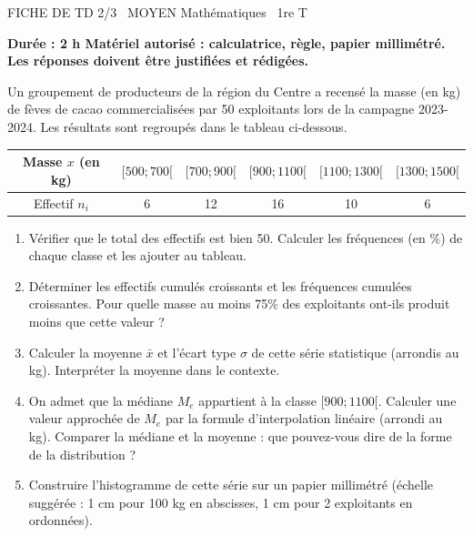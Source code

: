 \documentclass[11pt]{article}
\begin{document}
\begin{tcolorbox}[enhanced,colback=popink,colframe=popink,arc=10pt,boxrule=0pt,left=12pt,right=12pt,top=9pt,bottom=9pt]
{\color{white}\popxbold\small FICHE DE TD 2/3 \textbullet\ MOYEN \hfill Mathématiques \textbullet\ 1re T\par}
\end{tcolorbox}
\vspace{4pt}
\textbf{Durée : 2 h \quad Matériel autorisé : calculatrice, règle, papier millimétré. Les réponses doivent être justifiées et rédigées.}

\begin{exercice}
\label{exo:cacao}
Un groupement de producteurs de la région du Centre a recensé la masse (en kg) de fèves de cacao commercialisées par 50 exploitants lors de la campagne 2023-2024. Les résultats sont regroupés dans le tableau ci-dessous.

\begin{center}
\begin{tabular}{|c|c|c|c|c|c|}
\hline
Masse $x$ (en kg) & $[500; 700[$ & $[700; 900[$ & $[900; 1100[$ & $[1100; 1300[$ & $[1300; 1500[$ \\ \hline
Effectif $n_i$ & 6 & 12 & 16 & 10 & 6 \\ \hline
\end{tabular}
\end{center}

\begin{enumerate}
    \item Vérifier que le total des effectifs est bien 50. Calculer les fréquences (en \%) de chaque classe et les ajouter au tableau.
    \item Déterminer les effectifs cumulés croissants et les fréquences cumulées croissantes. Pour quelle masse au moins 75\% des exploitants ont-ils produit moins que cette valeur ?
    \item Calculer la moyenne $\bar{x}$ et l'écart type $\sigma$ de cette série statistique (arrondis au kg). Interpréter la moyenne dans le contexte.
    \item On admet que la médiane $M_e$ appartient à la classe $[900; 1100[$. Calculer une valeur approchée de $M_e$ par la formule d'interpolation linéaire (arrondi au kg). Comparer la médiane et la moyenne : que pouvez-vous dire de la forme de la distribution ?
    \item Construire l'histogramme de cette série sur un papier millimétré (échelle suggérée : 1 cm pour 100 kg en abscisses, 1 cm pour 2 exploitants en ordonnées).
\end{enumerate}
\end{exercice}
\end{document}
